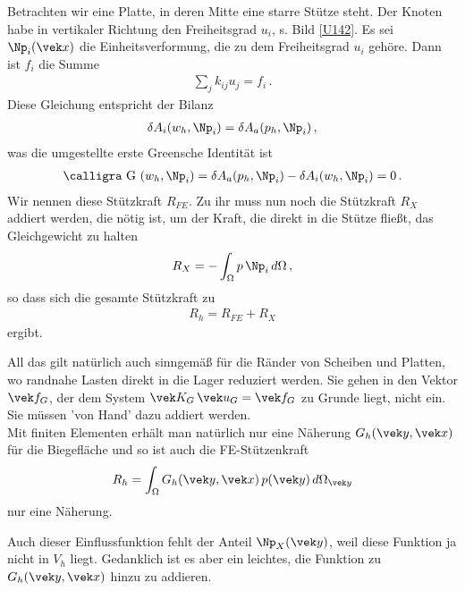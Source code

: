 {{{Betrachten wir eine Platte, in deren Mitte eine starre St\"{u}tze steht. Der Knoten habe in vertikaler Richtung den Freiheitsgrad $u_i$, s. Bild \ref{U142}. Es sei $\Np_i(\vek x)$ die Einheitsverformung, die zu dem Freiheitsgrad $u_i$  geh\"{o}re. Dann ist $f_i$ die Summe
\begin{align}
\sum_j k_{i j} u_j = f_i\,.
\end{align}
Diese Gleichung entspricht der Bilanz
\begin{align}
\delta A_i(w_h,\Np_i) = \delta A_a(p_h,\Np_i)\,,
\end{align}
was die umgestellte erste Greensche Identit\"{a}t ist
\begin{align}
\text{\normalfont\calligra G\,\,}(w_h,\Np_i) = \delta A_a(p_h,\Np_i) - \delta A_i(w_h,\Np_i) = 0\,.
\end{align}
Wir nennen diese St\"{u}tzkraft $R_{FE}$. Zu ihr muss nun noch die St\"{u}tzkraft $R_X$ addiert werden, die n\"{o}tig ist, um der Kraft, die direkt in die St\"{u}tze flie{\ss}t, das Gleichgewicht zu halten
\begin{align}
R_X = -\int_{\Omega} p\,\Np_i\,d\Omega\,,
\end{align}
so dass sich die gesamte St\"{u}tzkraft zu
\begin{align}
R_h = R_{FE} + R_{X}
\end{align}
ergibt.

All das gilt nat\"{u}rlich auch sinngem\"{a}{\ss} f\"{u}r die R\"{a}nder von Scheiben und Platten, wo randnahe Lasten direkt in die Lager reduziert werden. Sie gehen in den Vektor $\vek f_{G}$, der dem System $\vek K_{G}\,\vek u_{G} = \vek f_{G}$ zu Grunde liegt, nicht ein. Sie m\"{u}ssen 'von Hand' dazu addiert werden.\\

Mit finiten Elementen erh\"{a}lt man nat\"{u}rlich nur eine N\"{a}herung $G_h(\vek y,\vek x)$ f\"{u}r die Biegefl\"{a}che  und so ist auch die FE-St\"{u}tzenkraft
\begin{align}
R_h = \int_{\Omega} G_h(\vek y,\vek x)\,p(\vek y)\,d\Omega_{\vek y}
\end{align}
nur eine N\"{a}herung.

Auch dieser Einflussfunktion fehlt der Anteil $\Np_X(\vek y)$, weil diese Funktion ja nicht in $V_h$ liegt. Gedanklich ist es aber ein leichtes, die Funktion zu $G_h(\vek y,\vek x)$  hinzu zu addieren.
\\

}}}
